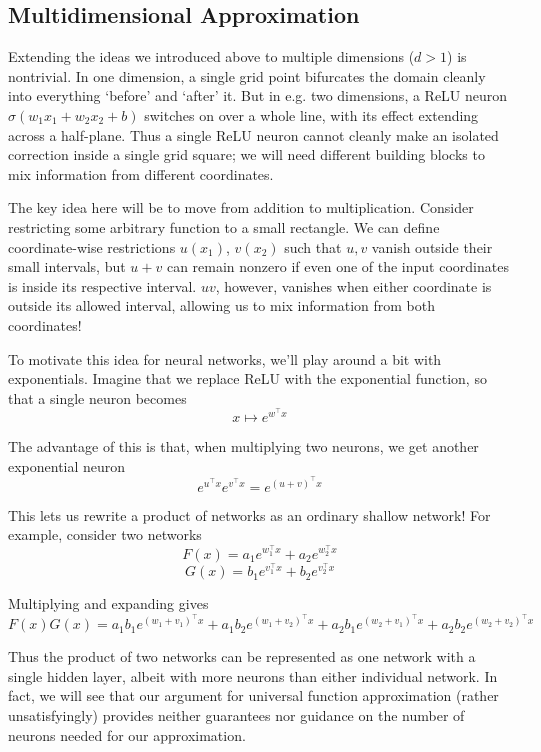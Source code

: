 \documentclass{article}
\theoremstyle{definition}
\begin{document}
\subsection{Multidimensional Approximation}

Extending the ideas we introduced above to multiple dimensions ($d>1$) is nontrivial. In one dimension, a single grid point bifurcates the domain cleanly into everything `before' and `after' it. But in e.g. two dimensions, a ReLU neuron $\sigma(w_1x_1 + w_2x_2 + b)$ switches on over a whole line, with its effect extending across a half-plane. Thus a single ReLU neuron cannot cleanly make an isolated correction inside a single grid square; we will need different building blocks to mix information from different coordinates.

The key idea here will be to move from addition to multiplication. Consider restricting some arbitrary function to a small rectangle. We can define coordinate-wise restrictions $u(x_1)$, $v(x_2)$ such that $u, v$ vanish outside their small intervals, but $u + v$ can remain nonzero if even one of the input coordinates is inside its respective interval. $uv$, however, vanishes when either coordinate is outside its allowed interval, allowing us to mix information from both coordinates!


To motivate this idea for neural networks, we'll play around a bit with exponentials. Imagine that we replace ReLU with the exponential function, so that a single neuron becomes
$$x \mapsto e^{w^\top x}$$

The advantage of this is that, when multiplying two neurons, we get another exponential neuron
$$e^{u^\top x}e^{v^\top x} = e^{(u+v)^\top x}$$

This lets us rewrite a product of networks as an ordinary shallow network! For example, consider two networks
$$F(x) = a_1e^{w^\top_1x} + a_2e^{w^\top_2 x}$$
$$G(x) = b_1e^{v^\top_1x} + b_2e^{v^\top_2 x}$$

Multiplying and expanding gives
$$F(x)G(x)=a_1b_1e^{(w_1+v_1)^\top x} + a_1b_2e^{(w_1+v_2)^\top x} + a_2b_1e^{(w_2+v_1)^\top x} + a_2b_2e^{(w_2+v_2)^\top x}$$

Thus the product of two networks can be represented as one network with a single hidden layer, albeit with more neurons than either individual network. In fact, we will see that our argument for universal function approximation (rather unsatisfyingly) provides neither guarantees nor guidance on the number of neurons needed for our approximation.
\end{document}

